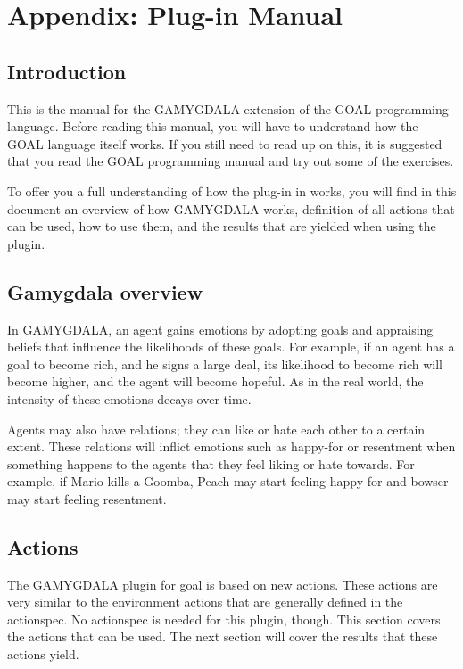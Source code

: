 \section{Appendix: Plug-in Manual}
\subsection{Introduction}
This is the manual for the GAMYGDALA extension of the GOAL programming language. Before reading this manual, you will have to understand how the GOAL language itself works. If you still need to read up on this, it is suggested that you read the GOAL programming manual and try out some of the exercises.

To offer you a full understanding of how the plug-in in works, you will find in this document an overview of how GAMYGDALA works, definition of all actions that can be used, how to use them, and the results that are yielded when using the plugin.

\subsection{Gamygdala overview}
In GAMYGDALA, an agent gains emotions by adopting goals and appraising beliefs that influence the likelihoods of these goals. For example, if an agent has a goal to become rich, and he signs a large deal, its likelihood to become rich will become higher, and the agent will become hopeful. As in the real world, the intensity of these emotions decays over time.

Agents may also have relations; they can like or hate each other to a certain extent. These relations will inflict emotions such as happy-for or resentment when something happens to the agents that they feel liking or hate towards. For example, if Mario kills a Goomba, Peach may start feeling happy-for and bowser may start feeling resentment.

\subsection{Actions}
The GAMYGDALA plugin for goal is based on new actions. These actions are very similar to the environment actions that are generally defined in the actionspec. No actionspec is needed for this plugin, though.
This section covers the actions that can be used. The next section will cover the results that these actions yield.







